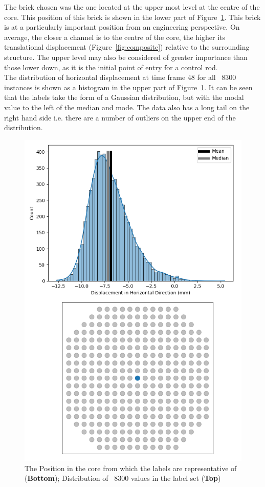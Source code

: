 \noindent
The brick chosen was the one located at the upper most level at the centre of the core. This position of this brick is shown in the lower part of Figure~\ref{fig:pos_distr}. This brick is at a particularly important position from an engineering perspective. On average, the closer a channel is to the centre of the core, the higher its translational displacement (Figure~\ref{fig:composite}) relative to the surrounding structure. The upper level may also be considered of greater importance than those lower down, as it is the initial point of entry for a control rod.
\\

\noindent
The distribution of horizontal displacement at time frame 48 for all ~8300 instances is shown as a histogram in the upper part of Figure~\ref{fig:pos_distr}. It can be seen that the labels take the form of a Gaussian distribution, but with the modal value to the left of the median and mode. The data also has a long tail on the right hand side i.e. there are a number of outliers on the upper end of the distribution.

\begin{figure}[p]
	\centering
	\includegraphics[scale=0.7]{Figures/position_distribution.png}
	\caption{The Position in the core from which the labels are representative of (\textbf{Bottom}); Distribution of ~8300 values in the label set (\textbf{Top})}
	\label{fig:pos_distr}
\end{figure}


